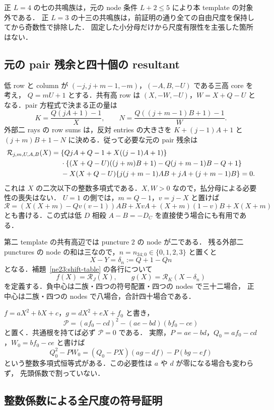 正 $L=4$ の七の共鳴族は，元の node 条件 $L+2\le5$ により本 template の対象外である．
正 $L=3$ の十三の共鳴族は，前証明の通り全ての自由尺度を保持してから奇数性で排除した．
固定した小分母だけから尺度有限性を主張した箇所はない．

\subsection{元の pair 残余と四十個の resultant}

低 row と column が $(-j,j+m-1,-m)$，$(-A,B,-U)$ である三高 core を考え，
$Q=mU+1$ とする．共有高 row は
$(X,-W,-U)$，$W=X+Q-U$ となる．pair 方程式で決まる正の量は
\[
 K=\frac{Q(jA+1)-1}{X},\qquad
 N=\frac{Q((j+m-1)B+1)-1}{W}.
\]
外部二 rays の row sums は，反対 entries の大きさを
$K+(j-1)A+1$ と $(j+m)B+1-N$ に決める．従って必要な元の pair 残余は
\begin{align}
\mathcal R_{j,m,U,A,B}(X)
={}&\{QjA+Q-1+X((j-1)A+1)\}\notag\\
 &\cdot\{(X+Q-U)((j+m)B+1)-Q(j+m-1)B-Q+1\}\notag\\
 &-X(X+Q-U)\{j(j+m-1)AB+jA+(j+m-1)B\}=0.
\label{ne23:residual}
\end{align}
これは $X$ の二次以下の整数多項式である．$X,W>0$ なので，払分母による必要性の喪失はない．
$U=1$ の側では，$m=Q-1$，$v=j-X$ と置けば
\[
\mathcal R=(X(X+m)-Qv(v-1))AB+XvA+(X+m)(1-v)B+X(X+m)
\]
とも書ける．この式は低 $D$ 相殺 $A-B=-D_C$ を直接使う場合にも有用である．

第二 template の共有高辺では puncture $2$ の node が二である．
残る外部二 punctures の node の和は三なので，$n=n_{34;0}\in\{0,1,2,3\}$ と置くと
\[
 X-Y=\delta_n:=Q+1-Qn
\]
となる．補題~\ref{ne23:shift-table} の各行について
\[
 f(X)=\mathcal R_J(X),\qquad g(X)=\mathcal R_K(X-\delta_n)
\]
を定義する．負中心は二族・四つの符号配置・四つの nodes で三十二場合，
正中心は二族・四つの nodes で八場合，合計四十場合である．

$f=aX^2+bX+c$，$g=dX^2+eX+f_0$ と書き，
\begin{equation}\label{ne23:resultant}
 \mathcal P=(af_0-cd)^2-(ae-bd)(bf_0-ce)
\end{equation}
と置く．共通根を持てば必ず $\mathcal P=0$ である．
実際，$P=ae-bd$，$Q_0=af_0-cd$，$W_0=bf_0-ce$ と書けば
\[
 Q_0^2-PW_0=(Q_0-PX)(ag-df)-P(bg-ef)
\]
という整数多項式恒等式がある．この必要性は $a$ や $d$ が零になる場合も変わらず，
先頭係数で割っていない．

\subsection{整数係数による全尺度の符号証明}

